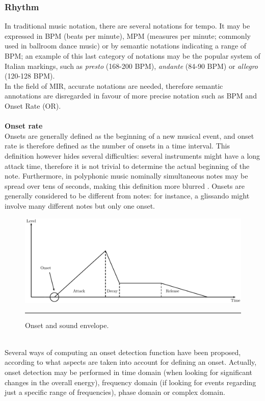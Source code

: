 \subsubsection{Rhythm}
In traditional music notation, there are several notations for tempo. It may be expressed in BPM (beats per minute), MPM (measures per minute; commonly used in ballroom dance music) or by semantic notations indicating a range of BPM; an example of this last category of notations may be the popular system of Italian markings, such as \textit{presto} (168-200 BPM), \textit{andante} (84-90 BPM) or \textit{allegro} (120-128 BPM). \\ In the field of MIR, accurate notations are needed, therefore semantic annotations are disregarded in favour of more precise notation such as BPM and Onset Rate (OR).
\\ \\ 
\textbf{Onset rate} \\ 
Onsets are generally defined as the beginning of a new musical event, and onset rate is therefore defined as the number of onsets in a time interval. This definition however hides several difficulties: several instruments might have a long attack time, therefore it is not trivial to determine the actual beginning of the note. Furthermore, in polyphonic music nominally simultaneous notes may be spread over tens of seconds, making this definition more blurred \cite{dixon06}. Onsets are generally considered to be different from notes: for instance, a glissando might involve many different notes but only one onset.
\begin{figure}[h]
\begin{center}
\includegraphics[scale=0.75]{Figures/onsets.pdf}
    \rule{20em}{0.5pt}
  \caption[Onset and sound envelope]{Onset and sound envelope.}
  \label{fig:GStreamer}
\end{center}
\end{figure} \\
Several ways of computing an onset detection function have been proposed, according to what aspects are taken into account for defining an onset. Actually, onset detection may be performed in time domain (when looking for significant changes in the overall energy), frequency domain (if looking for events regarding just a specific range of frequencies), phase domain or complex domain. 
